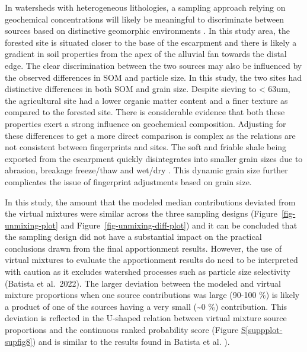 \documentclass[
  number]{elsarticle}
\newcommand*\quartosuppplotref[1]{Figure \hyperref[#1]{S\ref{#1}}}
\begin{document}
In watersheds with heterogeneous lithologies, a sampling approach
relying on geochemical concentrations will likely be meaningful to
discriminate between sources based on distinctive geomorphic
environments \citep{evrard2022}. In this study area, the forested site
is situated closer to the base of the escarpment and there is likely a
gradient in soil properties from the apex of the alluvial fan towards
the distal edge. The clear discrimination between the two sources may
also be influenced by the observed differences in SOM and particle size.
In this study, the two sites had distinctive differences in both SOM and
grain size. Despite sieving to \textless{} 63um, the agricultural site
had a lower organic matter content and a finer texture as compared to
the forested site. There is considerable evidence that both these
properties exert a strong influence on geochemical composition.
Adjusting for these differences to get a more direct comparison is
complex as the relations are not consistent between fingerprints and
sites. The soft and friable shale being exported from the escarpment
quickly disintegrates into smaller grain sizes due to abrasion, breakage
freeze/thaw and wet/dry \citep{koiter2013a}. This dynamic grain size
further complicates the issue of fingerprint adjustments based on grain
size.

In this study, the amount that the modeled median contributions deviated
from the virtual mixtures were similar across the three sampling designs
(Figure~\ref{fig-unmixing-plot} and Figure~\ref{fig-unmixing-diff-plot})
and it can be concluded that the sampling design did not have a
substantial impact on the practical conclusions drawn from the final
apportionment results. However, the use of virtual mixtures to evaluate
the apportionment results do need to be interpreted with caution as it
excludes watershed processes such as particle size selectivity (Batista
et al.~2022). The larger deviation between the modeled and virtual
mixture proportions when one source contributions was large (90-100 \%)
is likely a product of one of the sources having a very small
(\textasciitilde0 \%) contribution. This deviation is reflected in the
U-shaped relation between virtual mixture source proportions and the
continuous ranked probability score
(\quartosuppplotref{suppplot-supfig8}) and is similar to the results
found in Batista et al. \citep{batista2022}).
\end{document}
